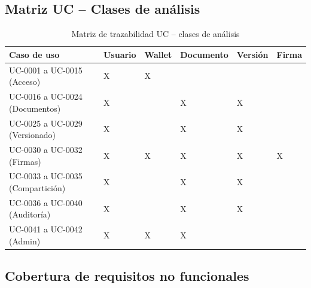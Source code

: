 \documentclass[11pt, a4paper]{article}
\begin{document}
\subsection{Matriz UC -- Clases de análisis}

{\setlength{\tabcolsep}{3pt}
\begin{table}[H]
\centering
\footnotesize
\begin{tabular}{|p{3.1cm}|p{1.5cm}|p{1.4cm}|p{1.6cm}|p{1.6cm}|p{1.4cm}|}
\hline
\textbf{Caso de uso} & \textbf{Usuario} & \textbf{Wallet} & \textbf{Documento} & \textbf{Versión} & \textbf{Firma} \\
\hline
\hline
UC-0001 a UC-0015 (Acceso) & X & X & & & \\
\hline
UC-0016 a UC-0024 (Documentos) & X & & X & X & \\
\hline
UC-0025 a UC-0029 (Versionado) & X & & X & X & \\
\hline
UC-0030 a UC-0032 (Firmas) & X & X & X & X & X \\
\hline
UC-0033 a UC-0035 (Compartición) & X & & X & X & \\
\hline
UC-0036 a UC-0040 (Auditoría) & X & & X & X & \\
\hline
UC-0041 a UC-0042 (Admin) & X & X & X & & \\
\hline
\end{tabular}
\caption{Matriz de trazabilidad UC -- clases de análisis}
\label{tab:cross-uc-classes}
\end{table}}

\subsection{Cobertura de requisitos no funcionales}
\end{document}
